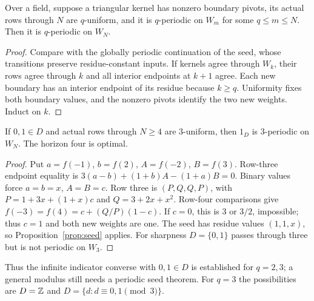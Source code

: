 \begin{proposition}\label{prop:seed}
Over a field, suppose a triangular kernel has nonzero boundary pivots, its actual rows through $N$ are $q$-uniform, and it is $q$-periodic on $W_m$ for some $q\le m\le N$. Then it is $q$-periodic on $W_N$.
\end{proposition}
\begin{proof}
Compare with the globally periodic continuation of the seed, whose transitions preserve residue-constant inputs. If kernels agree through $W_k$, their rows agree through $k$ and all interior endpoints at $k+1$ agree. Each new boundary has an interior endpoint of its residue because $k\ge q$. Uniformity fixes both boundary values, and the nonzero pivots identify the two new weights. Induct on $k$.
\end{proof}

\begin{proposition}\label{prop:three}
If $0,1\in D$ and actual rows through $N\ge4$ are $3$-uniform, then $1_D$ is $3$-periodic on $W_N$. The horizon four is optimal.
\end{proposition}
\begin{proof}
Put $a=f(-1)$, $b=f(2)$, $A=f(-2)$, $B=f(3)$. Row-three endpoint equality is
$3(a-b)+(1+b)A-(1+a)B=0$. Binary values force $a=b=x$, $A=B=c$. Row three is $(P,Q,Q,P)$, with $P=1+3x+(1+x)c$ and $Q=3+2x+x^2$. Row-four comparisons give
$f(-3)=f(4)=c+(Q/P)(1-c)$. If $c=0$, this is $3$ or $3/2$, impossible; thus $c=1$ and both new weights are one. The seed has residue values $(1,1,x)$, so Proposition~\ref{prop:seed} applies. For sharpness $D=\{0,1\}$ passes through three but is not periodic on $W_3$.
\end{proof}
Thus the infinite indicator converse with $0,1\in D$ is established for $q=2,3$; a general modulus still needs a periodic seed theorem. For $q=3$ the possibilities are $D=\mathbb Z$ and $D=\{d:d\equiv0,1\pmod3\}$.
